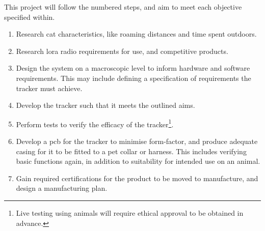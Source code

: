 This project will follow the numbered steps, and 
aim to meet each objective specified within. 

\begin{enumerate}
    \item Research cat characteristics, like roaming distances and time spent outdoors.
    \item Research \gls{lora} radio requirements for use, and competitive products.
    \item Design the system on a macroscopic level to inform hardware and software requirements. 
            This may include defining a specification of requirements the tracker must achieve. 
    \item Develop the tracker such that it meets the outlined aims. 
    \item Perform tests to verify the efficacy of the tracker\footnote{
        Live testing using animals will require ethical approval to be obtained in advance.
    }.
    \item Develop a \acrshort{pcb} for the tracker to minimise form-factor, and produce 
            adequate casing for it to be fitted to a pet collar or harness. This includes 
            verifying basic functions again, in addition to suitability for intended use on an animal.
    \item Gain required certifications for the product to be moved to manufacture, and design 
            a manufacturing plan.             
\end{enumerate}